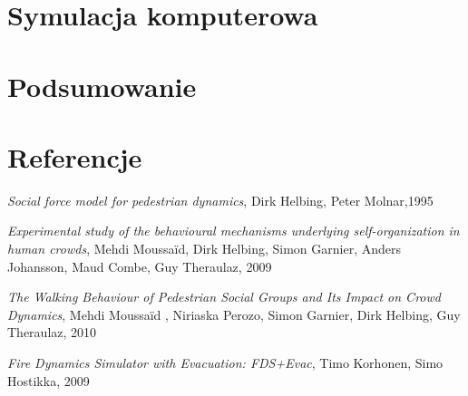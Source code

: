 \documentclass[12pt, a4paper]{report}
\begin{document}
\clearpage 

\tableofcontents

\setlength{\baselineskip}{18pt}
\clearpage 

\clearpage 

\clearpage 

\chapter{Symulacja komputerowa}

\chapter{Podsumowanie}

\chapter{Referencje}
\emph{Social force model for pedestrian dynamics}, Dirk Helbing, Peter Molnar,1995

\emph{Experimental study of the behavioural mechanisms underlying self-organization in human crowds}, Mehdi Moussaïd, Dirk Helbing, Simon Garnier, Anders Johansson, Maud Combe, Guy Theraulaz, 2009

\emph{The Walking Behaviour of Pedestrian Social Groups and Its Impact on Crowd Dynamics}, 
    Mehdi Moussaïd ,
    Niriaska Perozo,
    Simon Garnier,
    Dirk Helbing,
    Guy Theraulaz, 2010

\emph{Fire Dynamics Simulator with Evacuation: FDS+Evac}, Timo Korhonen, Simo Hostikka, 2009
\end{document}
